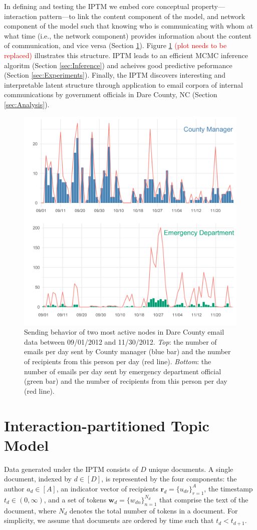 \documentclass{article}
\begin{document}
In defining and testing the IPTM we embed core conceptual property---interaction pattern---to link the content component of the model, and network component of the model such that knowing who is communicating with whom at what time (i.e., the network component) provides information about the content of communication, and vice versa (Section \ref{sec:model definition}). Figure \ref{fig:EDAplot} \textcolor{red}{(plot needs to be replaced)} illustrates this structure. IPTM leads to an efficient MCMC inference algoritm (Section \ref{sec:Inference}) and acheives good predictive peformance (Section \ref{sec:Experiments}). Finally, the IPTM discovers interesting and interpretable latent structure through application to email corpora of internal communications by government officials in Dare County, NC (Section \ref{sec:Analysis}). 
\begin{figure}[t]
	\centering
	\includegraphics[width=.48\textwidth]{plots/EDAplot.png}  
	\caption{Sending behavior of two most active nodes in Dare County email data between 09/01/2012 and 11/30/2012. \textit{Top}: the number of emails per day sent by County manager (blue bar) and the number of recipients from this person per day (red line). \textit{Bottom}: the number of emails per day sent by emergency department official (green bar) and the number of recipients from this person per day (red line).}
\label{fig:EDAplot}
\vskip -0.15in
\end{figure}
\section{Interaction-partitioned Topic Model}\label{sec:model definition}

Data generated under the IPTM consists of $D$ unique documents. A single document, indexed by $d \in [D]$, is represented by the four components: the author $a_d \in [A]$, an indicator vector of recipients $\boldsymbol{r}_d = \{u_{dr} \}_{r=1}^{A}$, the timestamp $t_d \in (0, \infty)$, and a set of tokens $\boldsymbol{w}_d= \{w_{dn} \}_{n=1}^{N_d}$ that comprise the text of the document, where $N_d$ denotes the total number of tokens in a document. For simplicity, we assume that documents are ordered by time such that $t_d < t_{d+1}$.
\end{document}
